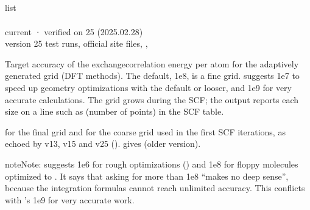 \documentclass[letterpaper,10pt,english,openany,oneside]{sphinxmanual}
\begin{document}
\subsection{}
\label{\detokenize{reference/grid:accuracy}}\label{\detokenize{reference/grid:grid-accuracy}}
\ignorespaces 
\sphinxAtStartPar
{} list\\
 \\
 current · verified on 25 (2025.02.28)\\
 version 25 test runs, official site files, , 

\sphinxAtStartPar
Target accuracy of the exchange\textendash{}correlation energy per atom for the adaptively generated grid (DFT
methods). The default, 1e\sphinxhyphen{}8, is a fine grid.  suggests 1e\sphinxhyphen{}7 to speed up geometry optimizations
with the default  or looser, and 1e\sphinxhyphen{}9 for very accurate calculations. The grid grows during the SCF; the output
reports each size on a line such as  (number of points) in the SCF table.

\sphinxAtStartPar
{}  for the final grid and  for the coarse grid used in the first SCF iterations, as echoed by v13, v15
and v25 ().  gives  (older version).

\begin{sphinxadmonition}{note}{Note:}
\sphinxAtStartPar
{} suggests 1e\sphinxhyphen{}6 for rough optimizations () and 1e\sphinxhyphen{}8 for floppy molecules optimized to
. It says that asking for more than 1e\sphinxhyphen{}8 “makes no deep sense”, because the integration formulas
cannot reach unlimited accuracy. This conflicts with ’s 1e\sphinxhyphen{}9 for very accurate work.
\end{sphinxadmonition}
\end{document}
